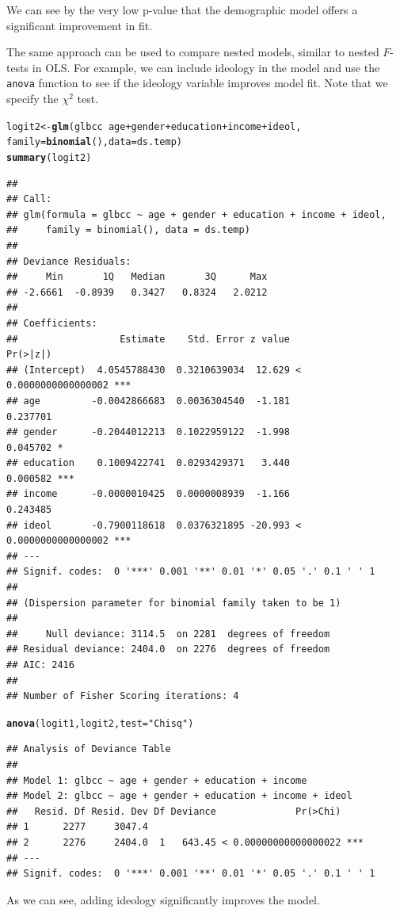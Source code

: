 \documentclass[11pt,openany]{book}\usepackage[]{graphicx}\usepackage[]{color}
\makeatletter
\newcommand{\hlstr}[1]{\textcolor[rgb]{0.192,0.494,0.8}{#1}}%
\newcommand{\hlopt}[1]{\textcolor[rgb]{0,0,0}{#1}}%
\newcommand{\hlstd}[1]{\textcolor[rgb]{0.345,0.345,0.345}{#1}}%
\newcommand{\hlkwb}[1]{\textcolor[rgb]{0.69,0.353,0.396}{#1}}%
\newcommand{\hlkwc}[1]{\textcolor[rgb]{0.333,0.667,0.333}{#1}}%
\newcommand{\hlkwd}[1]{\textcolor[rgb]{0.737,0.353,0.396}{\textbf{#1}}}%
\newenvironment{kframe}{%
 \def\at@end@of@kframe{}%
 \ifinner\ifhmode%
  \def\at@end@of@kframe{\end{minipage}}%
  \begin{minipage}{\columnwidth}%
 \fi\fi%
 \def\FrameCommand##1{\hskip\@totalleftmargin \hskip-\fboxsep
 \colorbox{shadecolor}{##1}\hskip-\fboxsep
     \hskip-\linewidth \hskip-\@totalleftmargin \hskip\columnwidth}%
 \MakeFramed {\advance\hsize-\width
   \@totalleftmargin\z@ \linewidth\hsize
   \@setminipage}}%
 {\par\unskip\endMakeFramed%
 \at@end@of@kframe}
\newenvironment{knitrout}{}{} %
\renewenvironment{knitrout}{\begin{singlespace}}{\end{singlespace}}
\makeatother
\begin{document}
\noindent We can see by the very low p-value that the demographic model offers a significant improvement in fit. 

The same approach can be used to compare nested models, similar to nested $F$-tests in OLS. For example, we can include ideology in the model and use the \texttt{anova} function to see if the ideology variable improves model fit. Note that we specify the $\chi^2$ test. 
\begin{knitrout}
\color{fgcolor}\begin{kframe}
\begin{alltt}
\hlstd{logit2} \hlkwb{<-} \hlkwd{glm}\hlstd{(glbcc} \hlopt{~} \hlstd{age} \hlopt{+} \hlstd{gender} \hlopt{+} \hlstd{education} \hlopt{+} \hlstd{income} \hlopt{+} \hlstd{ideol,}
    \hlkwc{family} \hlstd{=} \hlkwd{binomial}\hlstd{(),} \hlkwc{data} \hlstd{= ds.temp)}
\hlkwd{summary}\hlstd{(logit2)}
\end{alltt}
\begin{verbatim}
## 
## Call:
## glm(formula = glbcc ~ age + gender + education + income + ideol, 
##     family = binomial(), data = ds.temp)
## 
## Deviance Residuals: 
##     Min       1Q   Median       3Q      Max  
## -2.6661  -0.8939   0.3427   0.8324   2.0212  
## 
## Coefficients:
##                  Estimate    Std. Error z value             Pr(>|z|)    
## (Intercept)  4.0545788430  0.3210639034  12.629 < 0.0000000000000002 ***
## age         -0.0042866683  0.0036304540  -1.181             0.237701    
## gender      -0.2044012213  0.1022959122  -1.998             0.045702 *  
## education    0.1009422741  0.0293429371   3.440             0.000582 ***
## income      -0.0000010425  0.0000008939  -1.166             0.243485    
## ideol       -0.7900118618  0.0376321895 -20.993 < 0.0000000000000002 ***
## ---
## Signif. codes:  0 '***' 0.001 '**' 0.01 '*' 0.05 '.' 0.1 ' ' 1
## 
## (Dispersion parameter for binomial family taken to be 1)
## 
##     Null deviance: 3114.5  on 2281  degrees of freedom
## Residual deviance: 2404.0  on 2276  degrees of freedom
## AIC: 2416
## 
## Number of Fisher Scoring iterations: 4
\end{verbatim}
\begin{alltt}
\hlkwd{anova}\hlstd{(logit1, logit2,} \hlkwc{test} \hlstd{=} \hlstr{"Chisq"}\hlstd{)}
\end{alltt}
\begin{verbatim}
## Analysis of Deviance Table
## 
## Model 1: glbcc ~ age + gender + education + income
## Model 2: glbcc ~ age + gender + education + income + ideol
##   Resid. Df Resid. Dev Df Deviance              Pr(>Chi)    
## 1      2277     3047.4                                      
## 2      2276     2404.0  1   643.45 < 0.00000000000000022 ***
## ---
## Signif. codes:  0 '***' 0.001 '**' 0.01 '*' 0.05 '.' 0.1 ' ' 1
\end{verbatim}
\end{kframe}
\end{knitrout}
\noindent As we can see, adding ideology significantly improves the model. 
\end{document}
